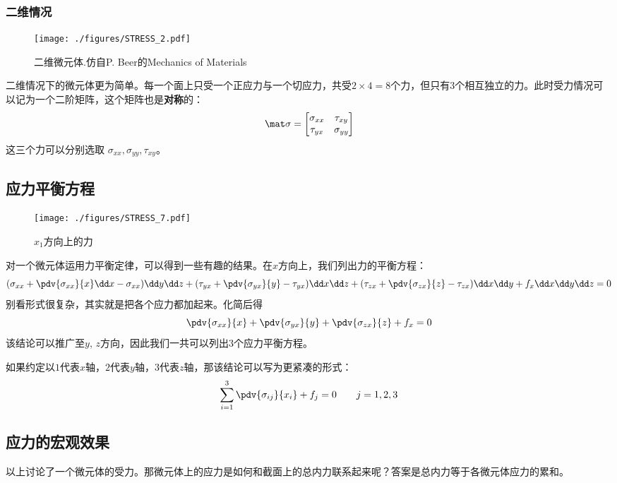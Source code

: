 \subsubsection{二维情况}
\begin{figure}[ht]
\centering
\texttt{[image: ./figures/STRESS\_2.pdf]}
\caption{二维微元体.仿自P. Beer的Mechanics of Materials} \label{STRESS_fig2}
\end{figure}

二维情况下的微元体更为简单。每一个面上只受一个正应力与一个切应力，共受$2\times4=8$个力，但只有3个相互独立的力。此时受力情况可以记为一个二阶矩阵，这个矩阵也是\textbf{对称}的：
\begin{equation}
\mat \sigma=
\begin{bmatrix}
\sigma_{xx} & \tau_{xy}\\
\tau_{yx} & \sigma_{yy}\\
\end{bmatrix}
\end{equation}
这三个力可以分别选取 $\sigma_{xx}, \sigma_{yy}, \tau_{xy}$。

\subsection{应力平衡方程}
\begin{figure}[ht]
\centering
\texttt{[image: ./figures/STRESS\_7.pdf]}
\caption{$x_1$方向上的力} \label{STRESS_fig7}
\end{figure}
对一个微元体运用力平衡定律，可以得到一些有趣的结果。在$x$方向上，我们列出力的平衡方程：
$$
(\sigma_{xx} + \pdv{\sigma_{xx}}{x} \dd x - \sigma_{xx})\dd y \dd z
+ (\tau_{yx} + \pdv{\sigma_{yx}}{y} - \tau_{yx}) \dd x \dd z
+ (\tau_{zx} + \pdv{\sigma_{zx}}{z} - \tau_{zx}) \dd x \dd y 
+ f_x \dd x \dd y \dd z= 0$$
别看形式很复杂，其实就是把各个应力都加起来。化简后得
$$
\pdv{\sigma_{xx}}{x} + \pdv{\sigma_{yx}}{y} + \pdv{\sigma_{zx}}{z} + f_x = 0
$$
该结论可以推广至$y$, $z$方向，因此我们一共可以列出$3$个应力平衡方程。

如果约定以$1$代表$x$轴，$2$代表$y$轴，$3$代表$z$轴，那该结论可以写为更紧凑的形式：
$$
\sum_{i=1}^3 \pdv{\sigma_{ij}}{x_i} + f_j=0 \qquad j=1,2,3
$$

\subsection{应力的宏观效果}
以上讨论了一个微元体的受力。那微元体上的应力是如何和截面上的总内力联系起来呢？答案是总内力等于各微元体应力的累和。

